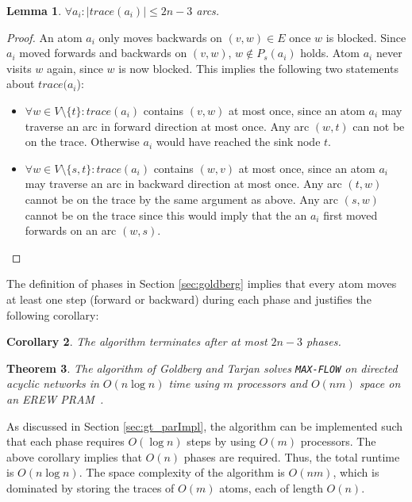 \documentclass[a4paper,10pt, twocolumn]{article}
\newtheorem{lemma}{Lemma}
\newtheorem{corollary}[lemma]{Corollary}
\newtheorem{theorem}[lemma]{Theorem}
\begin{document}
\begin{lemma}
$\forall a_i:\lvert trace(a_i) \rvert \leq 2n-3$ arcs.
\end{lemma}
\begin{proof}
An atom $a_i$ only moves backwards on $(v,w) \in E$ once $w$ is blocked. Since $a_i$ moved forwards and backwards on $(v,w)$, $w \notin P_s(a_i)$ holds. Atom $a_i$ never visits $w$ again, since $w$ is now blocked. This implies the following two statements about $trace(a_i$):
\begin{itemize}
	\item $\forall w \in V \setminus \{t\}: trace(a_i)$ contains $(v,w)$ at most once, since an atom $a_i$ may traverse an arc in forward direction at most once. Any arc $(w,t)$ can not be on the trace. Otherwise $a_i$ would have reached the sink node $t$.
	\item $\forall w \in V \setminus \{s,t\}: trace(a_i)$ contains $(w,v)$ at most once, since an atom $a_i$ may traverse an arc in backward direction at most once. Any arc $(t,w)$ cannot be on the trace by the same argument as above.  Any arc $(s,w)$ cannot be on the trace since this would imply that the an $a_i$ first moved forwards on an arc $(w,s)$.
\end{itemize}
\end{proof}

The definition of phases in Section \ref{sec:goldberg} implies that every atom moves at least one step (forward or backward) during each phase and justifies the following corollary:
\begin{corollary}
The algorithm terminates after at most $2n-3$ phases.
\end{corollary}

\begin{theorem}
The algorithm of Goldberg and Tarjan solves \lstinline|MAX-FLOW| on directed acyclic networks in $O(n \log n)$ time using $m$ processors and $O(nm)$ space on an EREW PRAM~\cite{goldberg89}.
\end{theorem}

As discussed in Section \ref{sec:gt_parImpl}, the algorithm can be implemented such that each phase requires $O(\log n)$ steps by using $O(m)$ processors. The above corollary implies that $O(n)$ phases are required. Thus, the total runtime is $O(n\log n)$. The space complexity of the algorithm is $O(nm)$, which is dominated by storing the traces of $O(m)$ atoms, each of length $O(n)$.  
\end{document}

